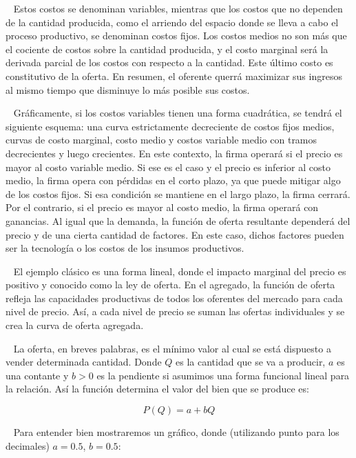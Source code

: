 \documentclass[
  letterpaper,
  DIV=11,
  numbers=noendperiod]{scrreport}
\begin{document}
~ Estos costos se denominan variables, mientras que los costos que no
dependen de la cantidad producida, como el arriendo del espacio donde se
lleva a cabo el proceso productivo, se denominan costos fijos. Los
costos medios no son más que el cociente de costos sobre la cantidad
producida, y el costo marginal será la derivada parcial de los costos
con respecto a la cantidad. Este último costo es constitutivo de la
oferta. En resumen, el oferente querrá maximizar sus ingresos al mismo
tiempo que disminuye lo más posible sus costos.

~ Gráficamente, si los costos variables tienen una forma cuadrática, se
tendrá el siguiente esquema: una curva estrictamente decreciente de
costos fijos medios, curvas de costo marginal, costo medio y costos
variable medio con tramos decrecientes y luego crecientes. En este
contexto, la firma operará si el precio es mayor al costo variable
medio. Si ese es el caso y el precio es inferior al costo medio, la
firma opera con pérdidas en el corto plazo, ya que puede mitigar algo de
los costos fijos. Si esa condición se mantiene en el largo plazo, la
firma cerrará. Por el contrario, si el precio es mayor al costo medio,
la firma operará con ganancias. Al igual que la demanda, la función de
oferta resultante dependerá del precio y de una cierta cantidad de
factores. En este caso, dichos factores pueden ser la tecnología o los
costos de los insumos productivos.

~ El ejemplo clásico es una forma lineal, donde el impacto marginal del
precio es positivo y conocido como la ley de oferta. En el agregado, la
función de oferta refleja las capacidades productivas de todos los
oferentes del mercado para cada nivel de precio. Así, a cada nivel de
precio se suman las ofertas individuales y se crea la curva de oferta
agregada.

~ La oferta, en breves palabras, es el mínimo valor al cual se está
dispuesto a vender determinada cantidad. Donde \(Q\) es la cantidad que
se va a producir, \(a\) es una contante y \(b>0\) es la pendiente si
asumimos una forma funcional lineal para la relación. Así la función
determina el valor del bien que se produce es:

\[
P(Q)=a+bQ
\]

~ Para entender bien mostraremos un gráfico, donde (utilizando punto
para los decimales) \(a=0.5\), \(b=0.5\):
\end{document}
